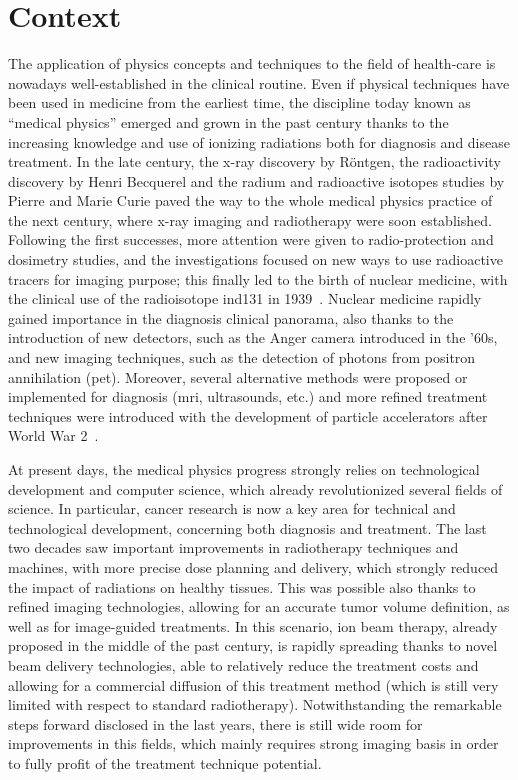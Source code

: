 \chapter{Context}\label{chap::1}

\vfill

\minitoc

\newpage

\glsresetall

The application of physics concepts and techniques to the field of health-care is nowadays well-established in the clinical routine. Even if physical techniques have been used in medicine from the earliest time\parencite{Duck2014}, the discipline today known as \enquote{medical physics} emerged and grown in the past century thanks to the increasing knowledge and use of ionizing radiations both for diagnosis and disease treatment. In the late  century, the x-ray discovery by R\"{o}ntgen, the radioactivity discovery by Henri Becquerel and the radium and radioactive isotopes studies by Pierre and Marie Curie paved the way to the whole medical physics practice of the next century, where x-ray imaging and radiotherapy were soon established. Following the first successes, more attention were given to radio-protection and dosimetry studies, and the investigations focused on new ways to use radioactive tracers for imaging purpose; this finally led to the birth of nuclear medicine, with the clinical use of the radioisotope \gls{ind131} in 1939~\parencite{Kereiakes1987}. Nuclear medicine rapidly gained importance in the diagnosis clinical panorama, also thanks to the introduction of new detectors, such as the Anger camera introduced in the '60s, and new imaging techniques, such as the detection of photons from positron annihilation (\gls{pet}). Moreover, several alternative methods were proposed or implemented for diagnosis (\gls{mri}, ultrasounds, etc.) and more refined treatment techniques were introduced with the development of particle accelerators after World War 2~\parencite{Keevil2012}.  

At present days, the medical physics progress strongly relies on technological development and computer science, which already revolutionized several fields of science. In particular, cancer research is now a key area for technical and technological development, concerning both diagnosis and treatment\parencite{Webb2009}. The last two decades saw important improvements in radiotherapy techniques and machines, with more precise dose planning and delivery, which strongly reduced the impact of radiations on healthy tissues. This was possible also thanks to refined imaging technologies, allowing for an accurate tumor volume definition, as well as for image-guided treatments. In this scenario, ion beam therapy, already proposed in the middle of the past century, is rapidly spreading thanks to novel beam delivery technologies, able to relatively reduce the treatment costs and allowing for a commercial diffusion of this treatment method (which is still very limited with respect to standard radiotherapy). Notwithstanding the remarkable steps forward disclosed in the last years, there is still wide room for improvements in this fields, which mainly requires strong imaging basis in order to fully profit of the treatment technique potential.

